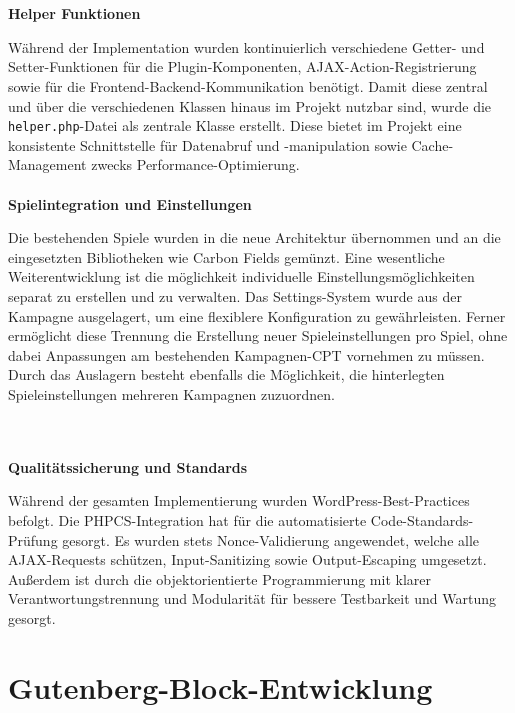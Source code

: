 \\\\
\textbf{Helper Funktionen}

Während der Implementation wurden kontinuierlich verschiedene Getter- und Setter-Funktionen für die Plugin-Komponenten, AJAX-Action-Registrierung sowie für die Frontend-Backend-Kommunikation benötigt.
Damit diese zentral und über die verschiedenen Klassen hinaus im Projekt nutzbar sind, wurde die \texttt{helper.php}-Datei als zentrale Klasse erstellt.
Diese bietet im Projekt eine konsistente Schnittstelle für Datenabruf und -manipulation sowie Cache-Management zwecks Performance-Optimierung.
\\\\
\textbf{Spielintegration und Einstellungen}

Die bestehenden Spiele wurden in die neue Architektur übernommen und an die eingesetzten Bibliotheken wie Carbon Fields gemünzt.
Eine wesentliche Weiterentwicklung ist die möglichkeit individuelle Einstellungsmöglichkeiten separat zu erstellen und zu verwalten.
Das Settings-System wurde aus der Kampagne ausgelagert, um eine flexiblere Konfiguration zu gewährleisten.
Ferner ermöglicht diese Trennung die Erstellung neuer Spieleinstellungen pro Spiel, ohne dabei Anpassungen am bestehenden Kampagnen-CPT vornehmen zu müssen.
Durch das Auslagern besteht ebenfalls die Möglichkeit, die hinterlegten Spieleinstellungen mehreren Kampagnen zuzuordnen.

\\\\
\textbf{Qualitätssicherung und Standards}

Während der gesamten Implementierung wurden WordPress-Best-Practices befolgt.
Die PHPCS-Integration hat für die automatisierte Code-Standards-Prüfung gesorgt.
Es wurden stets Nonce-Validierung angewendet, welche alle AJAX-Requests schützen, Input-Sanitizing sowie Output-Escaping umgesetzt.
Außerdem ist durch die objektorientierte Programmierung mit klarer Verantwortungstrennung und Modularität für bessere Testbarkeit und Wartung gesorgt.

\section{Gutenberg-Block-Entwicklung}


